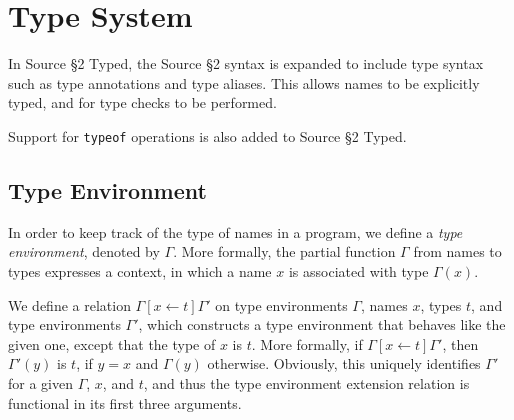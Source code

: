 \newcommand{\Rule}[2]{\genfrac{}{}{0.7pt}{}{{\setlength{\fboxrule}{0pt}\setlength{\fboxsep}{3mm}\fbox{$#1$}}}{{\setlength{\fboxrule}{0pt}\setlength{\fboxsep}{3mm}\fbox{$#2$}}}}

\newcommand{\TruE}{\textbf{\texttt{true}}}
\newcommand{\FalsE}{\textbf{\texttt{false}}}
\newcommand{\AndOp}{\texttt{\&\&}}
\newcommand{\OrOp}{\texttt{||}}
\newcommand{\ThenOp}{\texttt{?}}
\newcommand{\ElseOp}{\texttt{:}}
\newcommand{\Rc}{\texttt{\}}}
\newcommand{\Lc}{\texttt{\{}}
\newcommand{\Rp}{\texttt{)}}
\newcommand{\Lp}{\texttt{(}}
\newcommand{\Fun}{\textbf{\texttt{function}}}
\newcommand{\Let}{\textbf{\texttt{let}}}
\newcommand{\Return}{\textbf{\texttt{return}}}
\newcommand{\Const}{\textbf{\texttt{const}}}
\newcommand{\If}{\textbf{\texttt{if}}}
\newcommand{\Else}{\textbf{\texttt{else}}}
\newcommand{\Bool}{\texttt{boolean}}
\newcommand{\Number}{\texttt{number}}
\newcommand{\String}{\texttt{string}}
\newcommand{\Undefined}{\texttt{undefined}}
\newcommand{\Null}{\texttt{null}}
\newcommand{\Any}{\texttt{any}}
\newcommand{\Void}{\texttt{void}}
\newcommand{\Pred}{\textit{Pred}}
\newcommand{\type}{\textit{type}}
\newcommand{\polytype}{\textit{polytype}}
\newcommand{\predtype}{\textit{predtype}}
\newcommand{\ExtractPos}{\ensuremath{\textit{Extract}^+}}
\newcommand{\ExtractNeg}{\ensuremath{\textit{Extract}^-}}

\newtheorem{definition}{Definition}[section]

\section{Type System}  

In Source \S 2 Typed, the Source \S 2 syntax is expanded to include type syntax such as type annotations and type aliases.
This allows names to be explicitly typed, and for type checks to be performed.

Support for \texttt{typeof} operations is also added to Source \S 2 Typed.

\subsection{Type Environment}

In order to keep track of the type of names in a program, we define a
\emph{type environment}, denoted by $\Gamma$. More formally,
the partial function $\Gamma$ from names to types expresses a 
context, in which a name $x$ is associated with type $\Gamma(x)$. 

We define a relation $\Gamma[x \leftarrow t]\Gamma'$ on type environments 
$\Gamma$, names $x$, types $t$, and type environments $\Gamma'$,
which constructs a type environment that behaves like the 
given one, except that the type of $x$ is $t$. More formally, 
if $\Gamma[x \leftarrow t]\Gamma'$, then $\Gamma'(y)$ is $t$, 
if $y=x$ and $\Gamma(y)$ 
otherwise. Obviously, this uniquely identifies $\Gamma'$ for
a given $\Gamma$, $x$, and $t$, and thus the type environment extension
relation is functional in its first three arguments.

